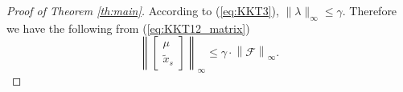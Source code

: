 \documentclass[12pt]{article}  %
\newcommand{\Fc}{{\mathcal{F}}}
\newcommand{\Nc}{{\mathcal{N}}}
\newtheorem*{proof}{\textbf{Proof}}
\begin{document}
\begin{proof}[Proof of Theorem \ref{th:main}]
	
	According to (\ref{eq:KKT3}), $\|\lambda\|_\infty \leq \gamma$. 
	Therefore we have the following from (\ref{eq:KKT12_matrix})
	\begin{equation}\label{eq:mu_xs_bounded}
	\left\|\begin{bmatrix}
	\mu \\ \tilde{x}_s 
	\end{bmatrix}\right\|_\infty
	\leq \gamma \cdot
	\left\|\Fc\right\|_\infty.
	\end{equation}
	

\end{proof}
\end{document}
